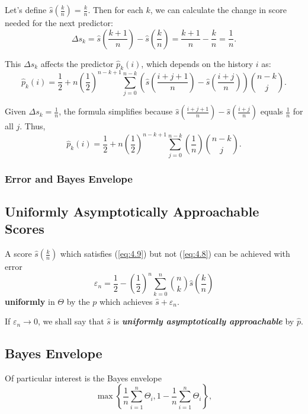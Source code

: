 \documentclass[11pt]{article}
\numberwithin{equation}{section}
\theoremstyle{boldStyle}
\begin{document}
Let's define $\hat{s}\left(\frac{k}{n}\right) = \frac{k}{n}$. Then for each $k$, we can calculate the change in score needed for the next predictor:
\[
\Delta s_k = \hat{s}\left(\frac{k+1}{n}\right) - \hat{s}\left(\frac{k}{n}\right) = \frac{k+1}{n} - \frac{k}{n} = \frac{1}{n}.
\]

This $\Delta s_k$ affects the predictor $\hat{p}_k(i)$, which depends on the history $i$ as:
\[
\hat{p}_k(i) = \frac{1}{2} + n \left(\frac{1}{2}\right)^{n-k+1} \sum_{j=0}^{n-k} \left(\hat{s} \left( \frac{i+j+1}{n} \right) - \hat{s} \left( \frac{i+j}{n} \right) \right) \binom{n-k}{j}.
\]

Given $\Delta s_k = \frac{1}{n}$, the formula simplifies because $\hat{s} \left( \frac{i+j+1}{n} \right) - \hat{s} \left( \frac{i+j}{n} \right)$ equals $\frac{1}{n}$ for all $j$. Thus,
\[
\hat{p}_k(i) = \frac{1}{2} + n \left(\frac{1}{2}\right)^{n-k+1} \sum_{j=0}^{n-k} \left(\frac{1}{n}\right) \binom{n-k}{j}.
\]

\subsubsection{Error and Bayes Envelope}

\subsection{Uniformly Asymptotically Approachable Scores}

A score $\hat{s}(\frac{k}{n})$ which satisfies (\ref{eq:4.9}) but not (\ref{eq:4.8}) can be achieved with error 
\begin{equation} \label{eq:4.12}
    \varepsilon_n = \frac{1}{2} - \left(\frac{1}{2}\right)^n \sum_{k=0}^n \binom{n}{k} \hat{s} \left(\frac{k}{n}\right)
\end{equation}
\textbf{uniformly} in $\Theta$ by the $p$ which achieves $\hat{s} + \varepsilon_n$.

If $\varepsilon_n \rightarrow 0$, we shall say that $\hat{s}$ is \textbf{\textit{uniformly asymptotically approachable}} by $\hat{p}$.

\subsection{Bayes Envelope}

Of particular interest is the Bayes envelope 
\begin{equation*} 
    \max \left\{ \frac{1}{n} \sum_{i=1}^n \Theta_i, 1 - \frac{1}{n} \sum_{i=1}^n \Theta_i \right\},
\end{equation*}
\end{document}
